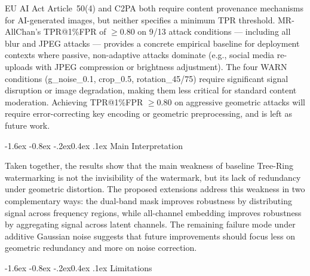 \documentclass[10pt,twocolumn]{article}
\makeatletter
\renewcommand\subsection{\@startsection{subsection}{2}{\z@}%
  {-1.6ex \@plus -0.8ex \@minus -.2ex}{0.4ex \@plus .1ex}%
  {\normalfont\normalsize\itshape}}
\makeatother
\begin{document}
EU AI Act Article~50(4) and C2PA both require content provenance
mechanisms for AI-generated images, but neither specifies a minimum
TPR threshold.
MR-AllChan's TPR@1\%FPR of $\geq$0.80 on 9/13 attack conditions ---
including all blur and JPEG attacks --- provides a concrete empirical
baseline for deployment contexts where passive, non-adaptive attacks
dominate (e.g., social media re-uploads with JPEG compression or
brightness adjustment).
The four WARN conditions (g\_noise\_0.1, crop\_0.5, rotation\_45/75) require
significant signal disruption or image degradation, making them
less critical for standard content moderation.
Achieving TPR@1\%FPR $\geq$0.80 on aggressive geometric attacks
will require error-correcting key encoding or geometric preprocessing,
and is left as future work.

\subsection{Main Interpretation}

Taken together, the results show that the main weakness of baseline
Tree-Ring watermarking is not the invisibility of the watermark, but
its lack of redundancy under geometric distortion.
The proposed extensions address this weakness in two complementary ways:
the dual-band mask improves robustness by distributing signal across
frequency regions, while all-channel embedding improves robustness by
aggregating signal across latent channels.
The remaining failure mode under additive Gaussian noise suggests that
future improvements should focus less on geometric redundancy and more
on noise correction.

\subsection{Limitations}
\end{document}
